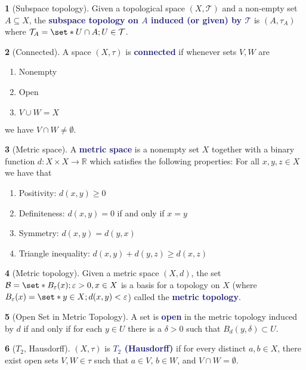 \documentclass[11pt]{article}
\numberwithin{equation}{section}
\newcommand{\navy}[1]{\textcolor{MidnightBlue}{\bf #1}}
\theoremstyle{plain}
\theoremstyle{definition}
\newtheorem{definition}{\color{MidnightBlue}{\textbf{Definition}}}[section]
\def\Set{\set*}%
\def\ss{\subset}
\def\sse{\subseteq}
\newcommand{\1}{\mathbbm 1}
\def\d{\delta}
\def\t{\tau}
\newcommand{\e}{\varepsilon}
\newcommand{\RR}{\mathbb R}
\newcommand{\tT}{\mathcal T}
\newcommand{\bB}{\mathcal B}
\begin{document}
\begin{definition}[Subspace topology]
Given a topological space $(X,\tT)$ and a non-empty set $A \sse X$, the \navy{subspace topology on $A$ induced (or given) by $\tT$} is $(A, \t_A)$ where $\tT_A = \Set{U \cap A; U \in \tT}$.
\end{definition}

\begin{definition}[Connected]
A space $(X,\t)$ is \navy{connected} if whenever sets $V,W$ are
\begin{enumerate}
\item Nonempty
\item Open
\item $V \cup W = X$
\end{enumerate}
we have $V \cap W \neq \emptyset$.
\end{definition}

\begin{definition}[Metric space]
A \navy{metric space} is a nonempty set $X$ together with a binary function $d : X\times X \to \RR$ which satisfies the following properties: For all $x,y,z \in X$ we have that
\begin{enumerate}
\item Positivity: $d(x,y) \geq 0$
\item Definiteness: $d(x,y) = 0$ if and only if $x=y$
\item Symmetry: $d(x,y) = d(y,x)$
\item Triangle inequality: $d(x,y) + d(y,z) \geq d(x,z)$
\end{enumerate}
\end{definition}

\begin{definition}[Metric topology]
Given a metric space $(X,d)$, the set $\bB = \Set{B_\e(x); \e > 0, x \in X}$ is a basis for a topology on $X$ (where $B_\e(x) = \Set{y \in X; d(x,y) < \e}$) called the \navy{metric topology}.
\end{definition}

\begin{definition}[Open Set in Metric Topology]
A set is \navy{open} in the metric topology induced by $d$ if and only if for each $y \in U$ there is a $\d > 0$ such that $B_d(y, \d) \ss U$.
\end{definition}

\begin{definition}[$T_2$, Hausdorff]
$(X,\t)$ is \navy{$T_2$ (Hausdorff)} if for every distinct $a,b \in X$, there exist open sets $V,W \in \t$ such that $a \in V$, $b \in W$, and $V \cap W = \emptyset$.
\end{definition}
\end{document}
